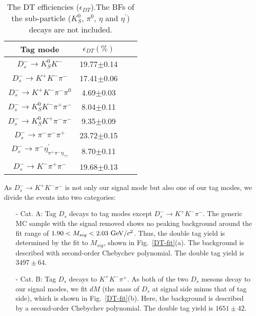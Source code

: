 \documentclass[aps,prd,twocolumn,showpacs,amsmath,amssymb]{revtex4-1}
\begin{document}
\begin{table}[htbp]
    \caption{ The DT efficiencies ($\epsilon_{DT}$).The BFs of the sub-particle ($K_{S}^{0}$, $\pi^{0}$, $\eta$ and $\eta^{'}$) decays are not included.}
    \label{DT-eff}
    \begin{center}
        \begin{tabular}{cccc}
            \hline\hline
            Tag mode   & $\epsilon_{DT}(\%)$\\
            \hline
            $D_{s}^{-} \rightarrow K_{S}^{0}K^{-}$                                                   & 19.77$\pm$0.14\\
            $D_{s}^{-} \rightarrow K^{+}K^{-}\pi^{-}$                                                & 17.41$\pm$0.06\\
            $D_{s}^{-} \rightarrow K^{+}K^{-}\pi^{-}\pi^{0}$                                         &  4.69$\pm$0.03\\
            $D_{s}^{-} \rightarrow K_{S}^{0}K^{-}\pi^{+}\pi^{-}$                                     &  8.04$\pm$0.11\\
            $D_{s}^{-} \rightarrow K_{S}^{0}K^{+}\pi^{-}\pi^{-}$                                     &  9.35$\pm$0.09\\
            $D_{s}^{-} \rightarrow \pi^{-}\pi^{-}\pi^{+}$                                            & 23.72$\pm$0.15\\
            $D_{s}^{-} \rightarrow \pi^{-}\eta_{\pi^{+}\pi^{-}\eta_{\gamma\gamma}}^{'}$               &  8.70$\pm$0.11\\
            $D_{s}^{-} \rightarrow K^{-}\pi^{+}\pi^{-}$                                              & 19.68$\pm$0.13\\
            \hline\hline
        \end{tabular}
    \end{center}
\end{table}

As $D_{s}^{-} \rightarrow K^{+}K^{-}\pi^{-}$ is not only our signal mode but also one of our tag modes, we divide the events into two categories:

\begin{itemize}
    \item[-] Cat. A: Tag $D_{s}$ decays to tag modes except $D_{s}^{-} \rightarrow K^{+}K^{-}\pi^{-}$. The generic MC sample with the signal removed shows no peaking background around the fit range of $1.90 < M_{sig} < 2.03 \ {\rm GeV}/c^{2}$.
        Thus, the double tag yield is determined by the fit to $M_{sig}$, shown in Fig.~\ref{DT-fit}(a). The background is described with second-order Chebychev polynomial. The double tag yield is $3497\pm64$. 
    \item[-] Cat. B: Tag $D_{s}$ decays to $K^{+}K^{-}\pi^{+}$. As both of the two $D_{s}$ mesons decay to our signal modes, we fit $dM$ (the mass of $D_{s}$ at signal side minus that of tag side), which is shown in Fig.~\ref{DT-fit}(b). 
        Here, the background is described by a second-order Chebychev polynomial. The double tag yield is $1651\pm42$. 
\end{itemize}
\end{document}
